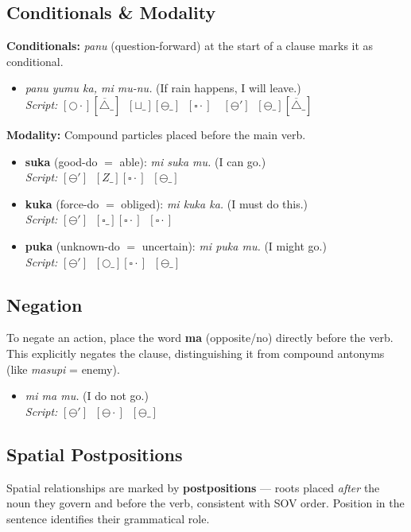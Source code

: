 \documentclass[12pt, a4paper]{article}
\begin{document}
\subsection{Conditionals \& Modality}
\textbf{Conditionals:} \textit{panu} (question-forward) at the start of a clause marks it as conditional.
\begin{itemize}
    \item \textit{panu yumu ka, mi mu-nu.} \quad (If rain happens, I will leave.) \\
    \textit{Script:} $[\bigcirc\cdot][\overline{\triangle}\_] \;\; [\sqcup\_][\ominus\_] \;\; [\square\cdot] \quad [\ominus'] \;\; [\ominus\_][\overline{\triangle}\_]$
\end{itemize}

\noindent\textbf{Modality:} Compound particles placed before the main verb.
\begin{itemize}
    \item \textbf{suka} (good-do $=$ able): \quad \textit{mi suka mu.} \quad (I can go.) \\
    \textit{Script:} $[\ominus'] \;\; [Z\_][\square\cdot] \;\; [\ominus\_]$
    \item \textbf{kuka} (force-do $=$ obliged): \quad \textit{mi kuka ka.} \quad (I must do this.) \\
    \textit{Script:} $[\ominus'] \;\; [\square\_][\square\cdot] \;\; [\square\cdot]$
    \item \textbf{puka} (unknown-do $=$ uncertain): \quad \textit{mi puka mu.} \quad (I might go.) \\
    \textit{Script:} $[\ominus'] \;\; [\bigcirc\_][\square\cdot] \;\; [\ominus\_]$
\end{itemize}

\subsection{Negation}
To negate an action, place the word \textbf{ma} (opposite/no) directly before the verb. This explicitly negates the clause, distinguishing it from compound antonyms (like \textit{masupi} = enemy).
\begin{itemize}
    \item \textit{mi ma mu.} \quad (I do not go.) \\
    \textit{Script:} $[\ominus'] \;\; [\ominus\cdot] \;\; [\ominus\_]$
\end{itemize}

\subsection{Spatial Postpositions}
Spatial relationships are marked by \textbf{postpositions} --- roots placed \textit{after} the noun they govern and before the verb, consistent with SOV order. Position in the sentence identifies their grammatical role.
\end{document}
